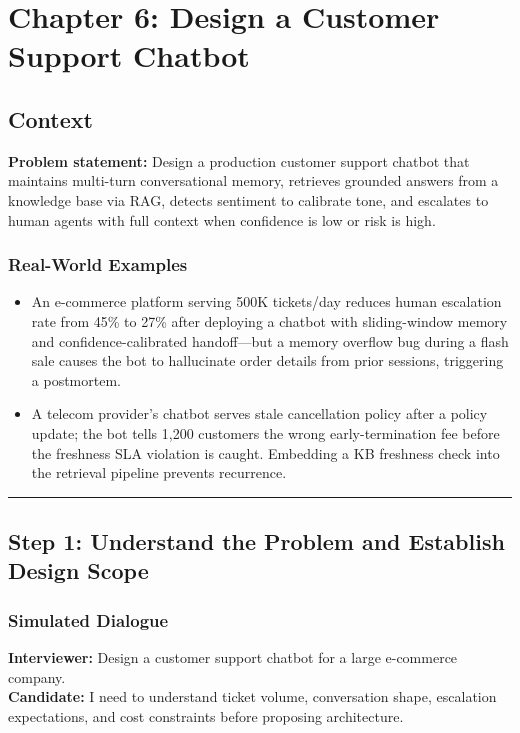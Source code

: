 \chapter{Chapter 6: Design a Customer Support Chatbot}

\section*{Context}

\textbf{Problem statement:} Design a production customer support chatbot that maintains multi-turn conversational memory, retrieves grounded answers from a knowledge base via RAG, detects sentiment to calibrate tone, and escalates to human agents with full context when confidence is low or risk is high.

\subsection*{Real-World Examples}

\begin{itemize}
  \item An e-commerce platform serving 500K tickets/day reduces human escalation rate from 45\% to 27\% after deploying a chatbot with sliding-window memory and confidence-calibrated handoff---but a memory overflow bug during a flash sale causes the bot to hallucinate order details from prior sessions, triggering a postmortem.
  \item A telecom provider's chatbot serves stale cancellation policy after a policy update; the bot tells 1,200 customers the wrong early-termination fee before the freshness SLA violation is caught. Embedding a KB freshness check into the retrieval pipeline prevents recurrence.
\end{itemize}

\bigskip\hrule\bigskip

\section*{Step 1: Understand the Problem and Establish Design Scope}

\subsection*{Simulated Dialogue}

\textbf{Interviewer:} Design a customer support chatbot for a large e-commerce company.\\
\textbf{Candidate:} I need to understand ticket volume, conversation shape, escalation expectations, and cost constraints before proposing architecture.

